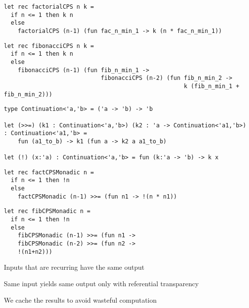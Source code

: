 \documentclass{beamer}
\begin{document}
\begin{frame}[fragile]
\begin{lstlisting}
let rec factorialCPS n k = 
  if n <= 1 then k n
  else 
    factorialCPS (n-1) (fun fac_n_min_1 -> k (n * fac_n_min_1))
\end{lstlisting}
\end{frame}

\begin{frame}[fragile]
\begin{lstlisting}
let rec fibonacciCPS n k = 
  if n <= 1 then k n
  else 
    fibonacciCPS (n-1) (fun fib_n_min_1 -> 
                            fibonacciCPS (n-2) (fun fib_n_min_2 -> 
                                                    k (fib_n_min_1 + fib_n_min_2)))
\end{lstlisting}
\end{frame}

\begin{frame}[fragile]
\begin{lstlisting}
type Continuation<'a,'b> = ('a -> 'b) -> 'b

let (>>=) (k1 : Continuation<'a,'b>) (k2 : 'a -> Continuation<'a1,'b>) : Continuation<'a1,'b> = 
    fun (a1_to_b) -> k1 (fun a -> k2 a a1_to_b)

let (!) (x:'a) : Continuation<'a,'b> = fun (k:'a -> 'b) -> k x
\end{lstlisting}
\end{frame}

\begin{frame}[fragile]
\begin{lstlisting}
let rec factCPSMonadic n =
  if n <= 1 then !n
  else
    factCPSMonadic (n-1) >>= (fun n1 -> !(n * n1))
\end{lstlisting}
\end{frame}

\begin{frame}[fragile]
\begin{lstlisting}
let rec fibCPSMonadic n =
  if n <= 1 then !n
  else
    fibCPSMonadic (n-1) >>= (fun n1 -> 
    fibCPSMonadic (n-2) >>= (fun n2 ->
    !(n1+n2)))
\end{lstlisting}
\end{frame}

\begin{slide}{
\item Inputs that are recurring have the same output
\item Same input yields same output only with referential transparency
\item We cache the results to avoid wasteful computation
}\end{slide}
\end{document}
